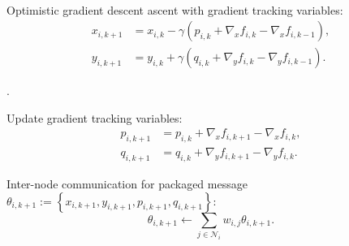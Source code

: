 \documentclass[10pt,a4paper]{amsart}
\begin{document}
\begin{algorithm}
\caption{\textbf{Distributed Optimistic Gradient Tracking (DOGT)}}
\begin{algorithmic}[1]\label{Alg_DOST}
\renewcommand{\algorithmicrequire}{\textbf{Initialization: }}
\

\STATE Optimistic gradient descent ascent with gradient tracking variables:
\begin{equation*}
\begin{aligned}
x_{i,k+1}&=x_{i,k}-\gamma \left( {p_{i,k}}+\nabla _xf_{i,k}-\nabla _xf_{i,k-1} \right) ,
\\
y_{i,k+1}&=y_{i,k}+\gamma \left( {q_{i,k}}+\nabla _yf_{i,k}-\nabla _yf_{i,k-1} \right) .
\end{aligned}
\end{equation*}

.

\STATE Update gradient tracking variables:
\begin{equation*}
\begin{aligned}
p_{i,k+1}&={p_{i,k}}+\nabla _xf_{i,k+1}-\nabla _xf_{i,k},
\\
q_{i,{k+1}}&=q_{i,k}+\nabla _yf_{i,k+1}-\nabla _yf_{i,k}.
\end{aligned}
\end{equation*}

\STATE Inter-node communication for packaged message $\theta _{i,k+1}:=\left\{ x_{i,k+1}, y_{i,k+1}, p_{i,k+1}, q_{i,k+1} \right\} $:
\begin{equation*}
\theta _{i,k+1}\gets \sum_{j\in \mathcal{N} _i}{w_{i,j}\theta _{i,k+1}}.
\end{equation*}
\ENDFOR
\end{algorithmic}
\end{algorithm}
\end{document}
